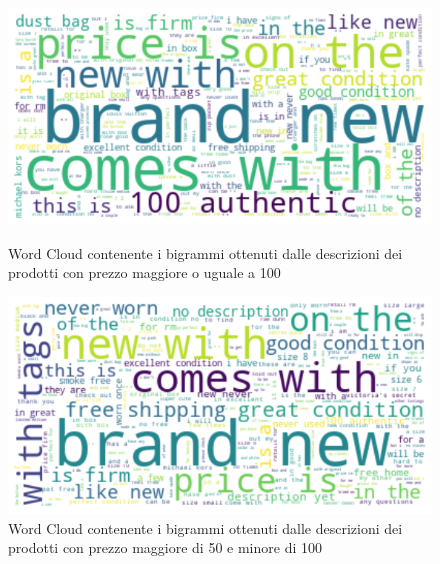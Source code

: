 \begin{figure}[!htb]
   \begin{minipage}{0.48\textwidth}
     \centering
     \includegraphics[width=.9\linewidth]{maggiore_100}
	\caption{Word Cloud contenente i bigrammi ottenuti dalle descrizioni dei prodotti con prezzo maggiore o uguale a 100}
	\label{fig:100}   
	\end{minipage}\hfill
   \begin{minipage}{0.48\textwidth}
     \centering
     \includegraphics[width=.9\linewidth]{50_100}
     \caption{Word Cloud contenente i bigrammi ottenuti dalle descrizioni dei prodotti con prezzo maggiore di 50 e minore di 100}
     \label{Fig:50_100}
   \end{minipage}
\end{figure}

